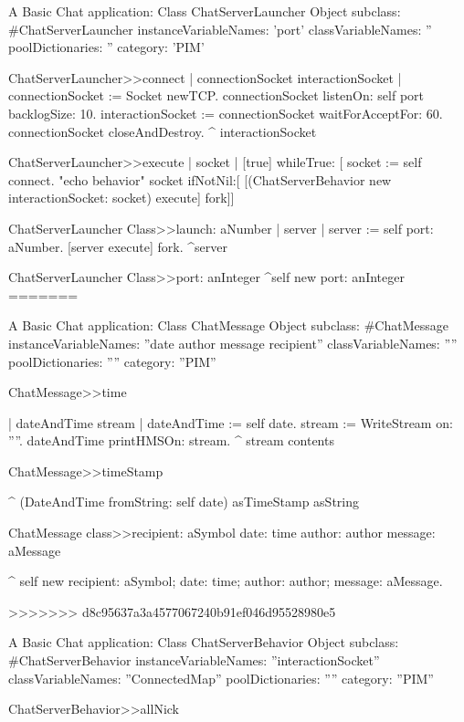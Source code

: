 \documentclass[a4paper,10pt,twoside]{book}
\begin{document}
\begin{script}{A Basic Chat application: Class ChatServerLauncher}
Object subclass: #ChatServerLauncher
	instanceVariableNames: 'port'
	classVariableNames: ''
	poolDictionaries: ''
	category: 'PIM'

ChatServerLauncher>>connect
	| connectionSocket interactionSocket |
	connectionSocket := Socket newTCP.
	connectionSocket listenOn: self port backlogSize: 10.
	interactionSocket := connectionSocket waitForAcceptFor: 60.
	connectionSocket closeAndDestroy.
	^ interactionSocket

ChatServerLauncher>>execute
	| socket |
	[true]
		whileTrue: [
			socket := self connect.
			"echo behavior"
			socket ifNotNil:[
				[(ChatServerBehavior new interactionSocket: socket) execute] fork]]

ChatServerLauncher Class>>launch: aNumber
	| server |
	server := self port: aNumber.
	[server execute] fork.
	^server

ChatServerLauncher Class>>port: anInteger
	^self new port: anInteger
=======
\begin{classdef}{A Basic Chat application: Class ChatMessage}
Object subclass: #ChatMessage
	instanceVariableNames: ''date author message recipient''
	classVariableNames: ''''
	poolDictionaries: ''''
	category: ''PIM''

ChatMessage>>time

	| dateAndTime stream |
	dateAndTime := self date.
	stream := WriteStream on: ''''.
	dateAndTime printHMSOn: stream.
	^ stream contents

ChatMessage>>timeStamp

	^ (DateAndTime fromString: self date) asTimeStamp asString

ChatMessage class>>recipient: aSymbol date: time author: author message: aMessage

	^ self new
			recipient: aSymbol;
			date: time;
			author: author;
			message: aMessage.
\end{classdef}
>>>>>>> d8c95637a3a4577067240b91ef046d95528980e5

\begin{classdef}{A Basic Chat application: Class ChatServerBehavior}
Object subclass: #ChatServerBehavior
	instanceVariableNames: ''interactionSocket''
	classVariableNames: ''ConnectedMap''
	poolDictionaries: ''''
	category: ''PIM''

ChatServerBehavior>>allNick


\end{classdef}
\end{script}
\end{document}
